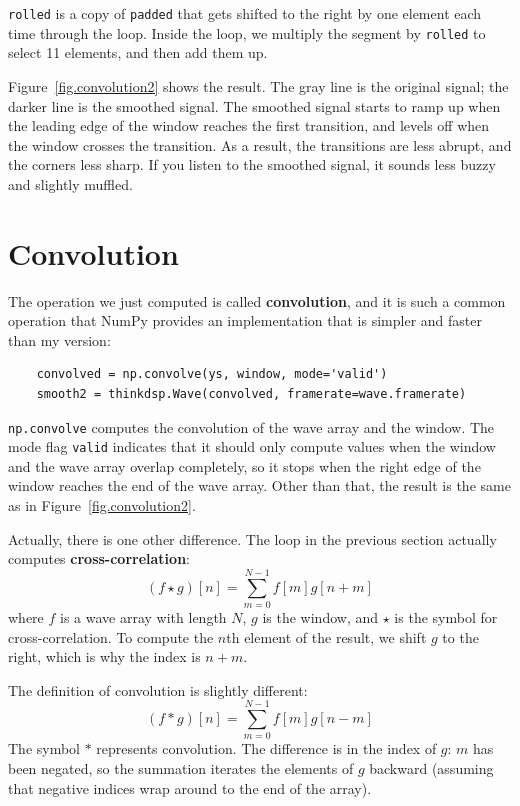 \documentclass[12pt]{book}
\begin{document}
{\tt rolled} is a copy of {\tt padded} that gets shifted to
the right by one element each time through the loop.  Inside
the loop, we multiply the segment by {\tt rolled} to select
11 elements, and then add them up.

Figure~\ref{fig.convolution2} shows the result.  The gray line
is the original signal; the darker line is the smoothed signal.
The smoothed signal starts to ramp up when the leading edge of
the window reaches the first transition, and levels off when
the window crosses the transition.  As a result, the transitions
are less abrupt, and the corners less sharp.  If you listen
to the smoothed signal, it sounds less buzzy and slightly muffled.


\section{Convolution}
\label{convolution}

The operation we just computed is called {\bf convolution},
and it is such a common operation that NumPy provides an
implementation that is simpler and faster than my version:

\begin{verbatim}
    convolved = np.convolve(ys, window, mode='valid')
    smooth2 = thinkdsp.Wave(convolved, framerate=wave.framerate)
\end{verbatim}

{\tt np.convolve} computes the convolution of the wave
array and the window.  The mode flag {\tt valid} indicates
that it should only compute values when the window and the
wave array overlap completely, so it stops when the right
edge of the window reaches the end of the wave array.  Other
than that, the result is the same as in Figure~\ref{fig.convolution2}.

\newcommand{\conv}{\ast}

Actually, there is one other difference.  The loop in the
previous section actually computes {\bf cross-correlation}:
%
\[ (f \star g)[n] = \sum_{m=0}^{N-1} f[m] g[n+m]  \]
%
where $f$ is a wave array with length $N$, $g$ is the window,
and $\star$ is the symbol for cross-correlation.  To
compute the $n$th element of the result, we shift $g$ to
the right, which is why the index is $n+m$.

The definition of convolution is slightly different:
%
\[ (f \conv g)[n] = \sum_{m=0}^{N-1} f[m] g[n-m]  \]
%
The symbol $\conv$ represents convolution.  The difference is in the
index of $g$: $m$ has been negated, so the summation iterates the
elements of $g$ backward (assuming that negative indices wrap around
to the end of the array).
\end{document}
